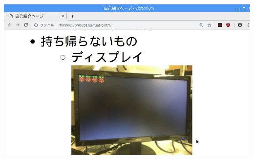 \documentclass[a4paper,12pt]{jarticle}
\begin{document}
\bigskip

\centering
\includegraphics[width=\textwidth]{textbook-img244.png}
\flushleft

\bigskip

\clearpage
\end{document}
